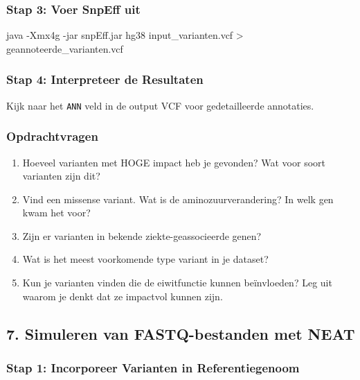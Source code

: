 \documentclass[
  letterpaper,
  DIV=11,
  numbers=noendperiod]{scrartcl}
\newenvironment{Shaded}{\begin{snugshade}}{\end{snugshade}}
\newcommand{\AttributeTok}[1]{\textcolor[rgb]{0.40,0.45,0.13}{#1}}
\newcommand{\ExtensionTok}[1]{\textcolor[rgb]{0.00,0.23,0.31}{#1}}
\newcommand{\NormalTok}[1]{\textcolor[rgb]{0.00,0.23,0.31}{#1}}
\newcommand{\OperatorTok}[1]{\textcolor[rgb]{0.37,0.37,0.37}{#1}}
\providecommand{\tightlist}{%
  \setlength{\itemsep}{0pt}\setlength{\parskip}{0pt}}\usepackage{longtable,booktabs,array}
\begin{document}
\subsubsection{Stap 3: Voer SnpEff uit}\label{stap-3-voer-snpeff-uit}

\begin{Shaded}
\begin{Highlighting}[]
\ExtensionTok{java} \AttributeTok{{-}Xmx4g} \AttributeTok{{-}jar}\NormalTok{ snpEff.jar hg38 input\_varianten.vcf }\OperatorTok{\textgreater{}}\NormalTok{ geannoteerde\_varianten.vcf}
\end{Highlighting}
\end{Shaded}

\subsubsection{Stap 4: Interpreteer de
Resultaten}\label{stap-4-interpreteer-de-resultaten}

Kijk naar het \texttt{ANN} veld in de output VCF voor gedetailleerde
annotaties.

\subsubsection{Opdrachtvragen}\label{opdrachtvragen-1}

\begin{enumerate}
\def\labelenumi{\arabic{enumi}.}
\tightlist
\item
  Hoeveel varianten met HOGE impact heb je gevonden? Wat voor soort
  varianten zijn dit?
\item
  Vind een missense variant. Wat is de aminozuurverandering? In welk gen
  kwam het voor?
\item
  Zijn er varianten in bekende ziekte-geassocieerde genen?
\item
  Wat is het meest voorkomende type variant in je dataset?
\item
  Kun je varianten vinden die de eiwitfunctie kunnen beïnvloeden? Leg
  uit waarom je denkt dat ze impactvol kunnen zijn.
\end{enumerate}

\subsection{7. Simuleren van FASTQ-bestanden met
NEAT}\label{simuleren-van-fastq-bestanden-met-neat}

\subsubsection{Stap 1: Incorporeer Varianten in
Referentiegenoom}\label{stap-1-incorporeer-varianten-in-referentiegenoom}
\end{document}

